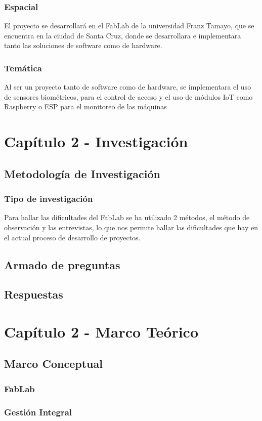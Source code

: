 \documentclass{article}
\begin{document}
\subsubsection{Espacial}
El proyecto se desarrollará en el FabLab de la universidad Franz Tamayo, que se encuentra en la ciudad de Santa Cruz, donde se desarrollara e implementara tanto las soluciones de software como de hardware.
\subsubsection{Temática}
Al ser un proyecto tanto de software como de hardware, se implementara el uso de sensores biométricos, para el control de acceso y el uso de módulos IoT como Raspberry o ESP para el monitoreo de las máquinas

\section{Capítulo 2 - Investigación}
\subsection{Metodología de Investigación}
\subsubsection{Tipo de investigación}
Para hallar las dificultades del FabLab se ha utilizado 2 métodos, el método de observación y las entrevistas, lo que nos permite hallar las dificultades que hay en el actual proceso de desarrollo de proyectos.
\subsection{Armado de preguntas}
\subsection{Respuestas}
\section{Capítulo 2 - Marco Teórico}
\subsection{Marco Conceptual}
\subsubsection{FabLab}
\subsubsection{Gestión Integral}
\end{document}

